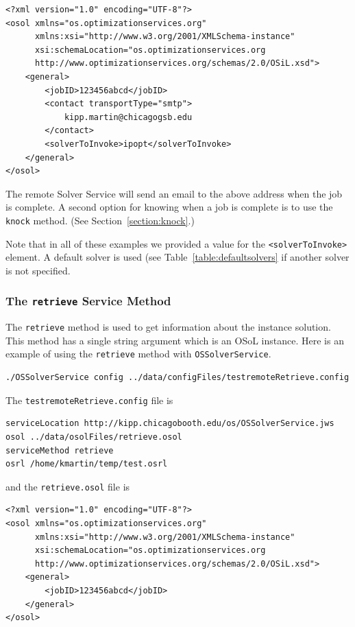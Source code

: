 \begin{verbatim}
<?xml version="1.0" encoding="UTF-8"?>
<osol xmlns="os.optimizationservices.org"
      xmlns:xsi="http://www.w3.org/2001/XMLSchema-instance"
      xsi:schemaLocation="os.optimizationservices.org
      http://www.optimizationservices.org/schemas/2.0/OSiL.xsd">
    <general>
        <jobID>123456abcd</jobID>
        <contact transportType="smtp">
            kipp.martin@chicagogsb.edu
        </contact>
        <solverToInvoke>ipopt</solverToInvoke>      
    </general>
</osol>
\end{verbatim}

The remote Solver Service will send an email to the above address when the job is complete. A second option for
knowing when a job is complete is to use the {\tt knock} method.
(See Section~\ref{section:knock}.)

Note that in all of these examples we provided a value for the {\tt <solverToInvoke>} element.
A default solver is used (see Table~\ref{table:defaultsolvers} if another solver is not specified.%



\subsubsection{The  {\tt retrieve} Service Method}\label{section:retrieve}

The {\tt retrieve} method is used to get information about the instance solution.  This method has a single string argument which is an OSoL instance. Here is an example of using the {\tt retrieve} method with {\tt OSSolverService}.
\begin{verbatim}
./OSSolverService config ../data/configFiles/testremoteRetrieve.config
\end{verbatim}
The {\tt testremoteRetrieve.config} file is
\begin{verbatim}
serviceLocation http://kipp.chicagobooth.edu/os/OSSolverService.jws
osol ../data/osolFiles/retrieve.osol
serviceMethod retrieve
osrl /home/kmartin/temp/test.osrl
\end{verbatim}
and the {\tt retrieve.osol} file is

\begin{verbatim}
<?xml version="1.0" encoding="UTF-8"?>
<osol xmlns="os.optimizationservices.org"
      xmlns:xsi="http://www.w3.org/2001/XMLSchema-instance"
      xsi:schemaLocation="os.optimizationservices.org
      http://www.optimizationservices.org/schemas/2.0/OSiL.xsd">
    <general>
        <jobID>123456abcd</jobID>
    </general>
</osol>
\end{verbatim}

